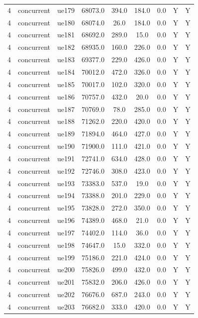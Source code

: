 \begin{table}[ht]
\begin{tabular}{|c|c|c|c|c|c|c|c|c|}
4 & concurrent & ue179 & 68073.0 & 394.0 & 184.0 & 0.0 & Y & Y \\
4 & concurrent & ue180 & 68074.0 & 26.0 & 184.0 & 0.0 & Y & Y \\
4 & concurrent & ue181 & 68692.0 & 289.0 & 15.0 & 0.0 & Y & Y \\
4 & concurrent & ue182 & 68935.0 & 160.0 & 226.0 & 0.0 & Y & Y \\
4 & concurrent & ue183 & 69377.0 & 229.0 & 426.0 & 0.0 & Y & Y \\
4 & concurrent & ue184 & 70012.0 & 472.0 & 326.0 & 0.0 & Y & Y \\
4 & concurrent & ue185 & 70017.0 & 102.0 & 320.0 & 0.0 & Y & Y \\
4 & concurrent & ue186 & 70757.0 & 432.0 & 20.0 & 0.0 & Y & Y \\
4 & concurrent & ue187 & 70769.0 & 78.0 & 285.0 & 0.0 & Y & Y \\
4 & concurrent & ue188 & 71262.0 & 220.0 & 420.0 & 0.0 & Y & Y \\
4 & concurrent & ue189 & 71894.0 & 464.0 & 427.0 & 0.0 & Y & Y \\
4 & concurrent & ue190 & 71900.0 & 111.0 & 421.0 & 0.0 & Y & Y \\
4 & concurrent & ue191 & 72741.0 & 634.0 & 428.0 & 0.0 & Y & Y \\
4 & concurrent & ue192 & 72746.0 & 308.0 & 423.0 & 0.0 & Y & Y \\
4 & concurrent & ue193 & 73383.0 & 537.0 & 19.0 & 0.0 & Y & Y \\
4 & concurrent & ue194 & 73388.0 & 201.0 & 229.0 & 0.0 & Y & Y \\
4 & concurrent & ue195 & 73828.0 & 272.0 & 350.0 & 0.0 & Y & Y \\
4 & concurrent & ue196 & 74389.0 & 468.0 & 21.0 & 0.0 & Y & Y \\
4 & concurrent & ue197 & 74402.0 & 114.0 & 36.0 & 0.0 & Y & Y \\
4 & concurrent & ue198 & 74647.0 & 15.0 & 332.0 & 0.0 & Y & Y \\
4 & concurrent & ue199 & 75186.0 & 221.0 & 424.0 & 0.0 & Y & Y \\
4 & concurrent & ue200 & 75826.0 & 499.0 & 432.0 & 0.0 & Y & Y \\
4 & concurrent & ue201 & 75832.0 & 206.0 & 426.0 & 0.0 & Y & Y \\
4 & concurrent & ue202 & 76676.0 & 687.0 & 243.0 & 0.0 & Y & Y \\
4 & concurrent & ue203 & 76682.0 & 333.0 & 420.0 & 0.0 & Y & Y \\

\end{tabular}
\end{table}
